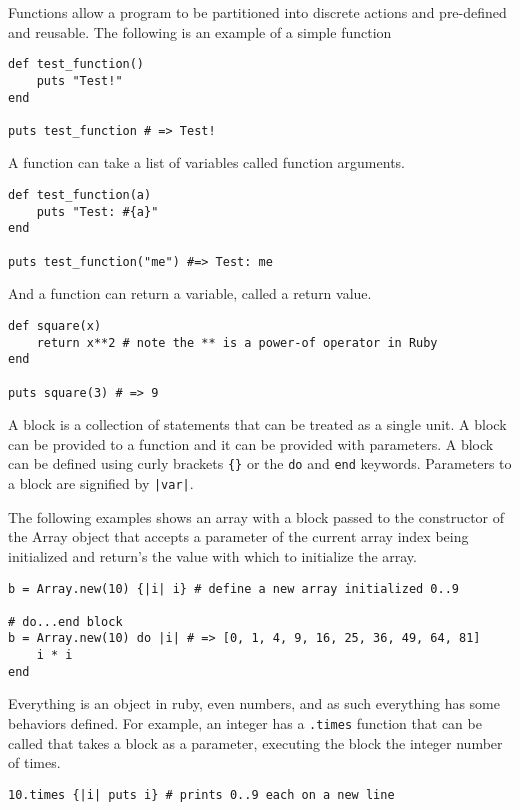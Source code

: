 \begin{bibunit}
Functions allow a program to be partitioned into discrete actions and pre-defined and reusable. The following is an example of a simple function

\begin{lstlisting}
def test_function()
	puts "Test!"
end

puts test_function # => Test!
\end{lstlisting}

A function can take a list of variables called function arguments.

\begin{lstlisting}
def test_function(a)
	puts "Test: #{a}"
end

puts test_function("me") #=> Test: me
\end{lstlisting}

And a function can return a variable, called a return value.

\begin{lstlisting}
def square(x)
	return x**2 # note the ** is a power-of operator in Ruby
end

puts square(3) # => 9
\end{lstlisting}

A block is a collection of statements that can be treated as a single unit. A block can be provided to a function and it can be provided with parameters. A block can be defined using curly brackets \texttt{\{\}} or the \texttt{do} and \texttt{end} keywords. Parameters to a block are signified by \texttt{|var|}.

The following examples shows an array with a block passed to the constructor of the Array object that accepts a parameter of the current array index being initialized and return's the value with which to initialize the array.

\begin{lstlisting}
b = Array.new(10) {|i| i} # define a new array initialized 0..9

# do...end block
b = Array.new(10) do |i| # => [0, 1, 4, 9, 16, 25, 36, 49, 64, 81]
	i * i
end
\end{lstlisting}

Everything is an object in ruby, even numbers, and as such everything has some behaviors defined. For example, an integer has a \texttt{.times} function that can be called that takes a block as a parameter, executing the block the integer number of times.

\begin{lstlisting}
10.times {|i| puts i} # prints 0..9 each on a new line
\end{lstlisting}


\end{bibunit}
